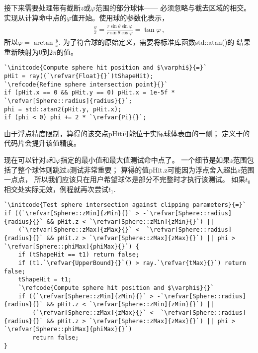 接下来需要处理带有截断$z$或$\varphi$范围的部分球体——
必须忽略与截去区域的相交。
实现从计算命中点的$\varphi$值开始。使用球的参数化表示，
\begin{align*}
    \frac{y}{x}=\frac{r\sin\theta\sin\varphi}{r\sin\theta\cos\varphi}=\tan\varphi\, ,
\end{align*}
所以$\displaystyle\varphi=\arctan\frac{y}{x}$.
为了符合球的原始定义，需要将标准库函数{\ttfamily std::atan()}的
结果重新映射为$0$到$2\pi$的值。
\begin{lstlisting}
`\initcode{Compute sphere hit position and $\varphi$}{=}`
pHit = ray((`\refvar{Float}{}`)tShapeHit);
`\refcode{Refine sphere intersection point}{}`
if (pHit.x == 0 && pHit.y == 0) pHit.x = 1e-5f * `\refvar[Sphere::radius]{radius}{}`;
phi = std::atan2(pHit.y, pHit.x);
if (phi < 0) phi += 2 * `\refvar{Pi}{}`;
\end{lstlisting}

由于浮点精度限制，算得的该交点{\ttfamily pHit}可能位于实际球体表面的一侧；
定义于的
代码片会提升该值精度。

现在可以针对$z$和$\varphi$指定的最小值和最大值测试命中点了。
一个细节是如果$z$范围包括了整个球体则跳过$z$测试非常重要；
算得的值{\ttfamily pHit.z}可能因为浮点舍入超出$z$范围一点点，
所以我们应该只在用户希望球体是部分不完整时才执行该测试。
如果$t_0$相交处实际无效，例程就再次尝试$t_1$.
\begin{lstlisting}
`\initcode{Test sphere intersection against clipping parameters}{=}`
if ((`\refvar[Sphere::zMin]{zMin}{}` > -`\refvar[Sphere::radius]{radius}{}` && pHit.z < `\refvar[Sphere::zMin]{zMin}{}`) ||
    (`\refvar[Sphere::zMax]{zMax}{}` <  `\refvar[Sphere::radius]{radius}{}` && pHit.z > `\refvar[Sphere::zMax]{zMax}{}`) || phi > `\refvar[Sphere::phiMax]{phiMax}{}`) {
    if (tShapeHit == t1) return false;
    if (t1.`\refvar{UpperBound}{}`() > ray.`\refvar{tMax}{}`) return false;
    tShapeHit = t1;
    `\refcode{Compute sphere hit position and $\varphi$}{}`
    if ((`\refvar[Sphere::zMin]{zMin}{}` > -`\refvar[Sphere::radius]{radius}{}` && pHit.z < `\refvar[Sphere::zMin]{zMin}{}`) ||
        (`\refvar[Sphere::zMax]{zMax}{}` <  `\refvar[Sphere::radius]{radius}{}` && pHit.z > `\refvar[Sphere::zMax]{zMax}{}`) || phi > `\refvar[Sphere::phiMax]{phiMax}{}`)
        return false;
}
\end{lstlisting}

